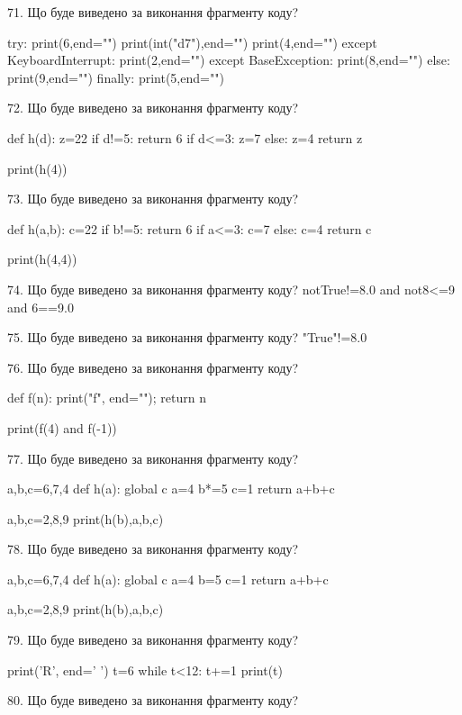 \documentclass[11pt]{article}
\begin{document}
71. Що буде виведено за виконання фрагменту коду?

try:
    print(6,end="")
    print(int("d7"),end="")
    print(4,end="")
except KeyboardInterrupt: print(2,end="")
except BaseException: print(8,end="")
else: print(9,end="")
finally: print(5,end="")


72. Що буде виведено за виконання фрагменту коду?

def h(d):
    z=22
    if d!=5: 
        return 6
    if d<=3:
         z=7
    else:
         z=4
    return z

print(h(4))


73. Що буде виведено за виконання фрагменту коду?

def h(a,b):
    c=22
    if b!=5:
        return 6
    if a<=3:
         c=7
    else: 
        c=4
    return c

print(h(4,4))

74. Що буде виведено за виконання фрагменту коду?
notTrue!=8.0 and not8<=9 and 6==9.0

75. Що буде виведено за виконання фрагменту коду?
"True"!=8.0

76. Що буде виведено за виконання фрагменту коду?

def f(n):
    print("f", end="");
    return n

print(f(4) and f(-1))


77. Що буде виведено за виконання фрагменту коду?

a,b,c=6,7,4
def h(a):
global c    a=4
    b*=5
    c=1
    return a+b+c

a,b,c=2,8,9
print(h(b),a,b,c)


78. Що буде виведено за виконання фрагменту коду?

a,b,c=6,7,4
def h(a):
global c    a=4
    b=5
    c=1
    return a+b+c

a,b,c=2,8,9
print(h(b),a,b,c)


79. Що буде виведено за виконання фрагменту коду?

print('R', end=' ')
t=6
while t<12:
    t+=1
print(t)



80. Що буде виведено за виконання фрагменту коду?
\end{document}
